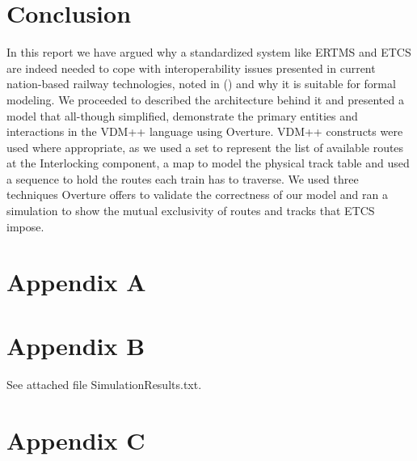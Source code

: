 \documentclass[preprint,12pt]{elsarticle}
\begin{document}
\section{Conclusion}

In this report we have argued why a standardized system like ERTMS and ETCS are indeed needed to cope with interoperability issues presented in current nation-based railway technologies, noted in (\citet{Commission2018}) and why it is suitable for formal modeling. We proceeded to described the architecture behind it and presented a model that all-though simplified, demonstrate the primary entities and interactions in the VDM++ language using Overture. VDM++ constructs were used where appropriate, as we used a set to represent the list of available routes at the Interlocking component, a map to model the physical track table and used a sequence to hold the routes each train has to traverse. We used three techniques Overture offers to validate the correctness of our model and ran a simulation to show the mutual exclusivity of routes and tracks that ETCS impose.




\appendix
\section*{Appendix A}


\section*{Appendix B}
See attached file SimulationResults.txt.

\section*{Appendix C}
\end{document}
